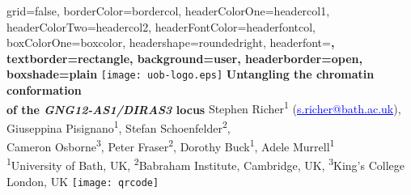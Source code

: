 \documentclass[a0paper, portrait]{baposter}
\begin{document}

\begin{poster}{
	grid=false,
	borderColor=bordercol, %
	headerColorOne=headercol1, %
	headerColorTwo=headercol2, %
	headerFontColor=headerfontcol, %
	boxColorOne=boxcolor, %
	headershape=roundedright, %
	headerfont=\Large\sf\bf, %
	textborder=rectangle,
	background=user,
	headerborder=open, %
	boxshade=plain
} 
%
%
{\texttt{[image: uob-logo.eps]}} %
{\sf\bf\huge 
	Untangling the chromatin conformation \\ of the \textit{GNG12-AS1/DIRAS3} locus}
{\vspace{0.5em} \normalsize 
	Stephen Richer\textsuperscript{1} (\textcolor{blue}{\underline{s.richer@bath.ac.uk}}),
	Giuseppina Pisignano\textsuperscript{1}, 
	Stefan Schoenfelder\textsuperscript{2}, 
	\\ 
	Cameron Osborne\textsuperscript{3}, 
	Peter Fraser\textsuperscript{2}, 
	Dorothy Buck\textsuperscript{1}, 
	Adele Murrell\textsuperscript{1} \\ 
{\vspace{0.5em} 
	\textsuperscript{1}University of Bath, UK,
	\textsuperscript{2}Babraham Institute, Cambridge, UK,
	\textsuperscript{3}King's College London, UK}} 
{\texttt{[image: qrcode]}} %


\end{poster}
\end{document}

